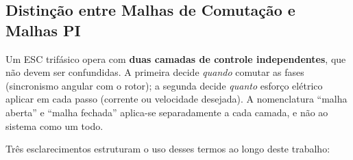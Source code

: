 \subsection{Distinção entre Malhas de Comutação e Malhas PI}
\label{subsec:distincao_malhas}

Um ESC trifásico opera com \textbf{duas camadas de controle independentes}, que não devem ser confundidas. A primeira decide \textit{quando} comutar as fases (sincronismo angular com o rotor); a segunda decide \textit{quanto} esforço elétrico aplicar em cada passo (corrente ou velocidade desejada). A nomenclatura ``malha aberta'' e ``malha fechada'' aplica-se separadamente a cada camada, e não ao sistema como um todo.

\begin{table}[H]
\centering
\caption{Duas camadas de controle no ESC deste trabalho}
\label{tab:camadas_controle}
\end{table}

Três esclarecimentos estruturam o uso desses termos ao longo deste trabalho:

